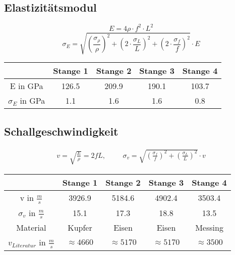 \documentclass[11pt]{beamer}
\begin{document}
\subsection{Elastizitätsmodul}
\begin{frame}
\begin{equation*}
E=4\rho\cdot f^2\cdot  L^2
\end{equation*}
\begin{equation*}
\sigma_{E}=\sqrt{(\frac{\sigma_{\rho}}{\rho})^2+(2\cdot \frac{\sigma_L}{L})^2+(2\cdot \frac{\sigma_f}{f})^2}\cdot E
\end{equation*}

\begin{table}[H]\centering
\begin{tabular}{c|cccc}
 & Stange 1 & Stange 2 & Stange 3 & Stange 4 \\
\hline 
E in GPa & 126.5 & 209.9 & 190.1 & 103.7 \\ 
$\sigma_E$ in GPa & 1.1 & 1.6 & 1.6 & 0.8 \\ 
\end{tabular} 
\end{table}
\end{frame}

\subsection{Schallgeschwindigkeit}
\begin{frame}
\begin{align*}
v=\sqrt{\frac{E}{\rho}}=2fL, \hspace{1cm}
\sigma_v=\sqrt{(\frac{\sigma_f}{f})^2+(\frac{\sigma_L}{L})^2}\cdot v
\end{align*}

\begin{table}[H]\centering
\begin{tabular}{c|cccc}
 & Stange 1 & Stange 2 & Stange 3 & Stange 4 \\ 
\hline
v in $\frac{m}{s}$ & 3926.9 & 5184.6 & 4902.4 & 3503.4 \\ 
$\sigma_{v}$ in $\frac{m}{s}$ & 15.1 & 17.3 & 18.8 & 13.5 \\ 
Material & Kupfer & Eisen & Eisen & Messing \\ 
$v_{Literatur}$ in $\frac{m}{s}$ &$\approx 4660$ & $\approx 5170$ & $\approx 5170$ & $\approx 3500$ \\ 
\end{tabular} 
\end{table}
\end{frame}
\end{document}
